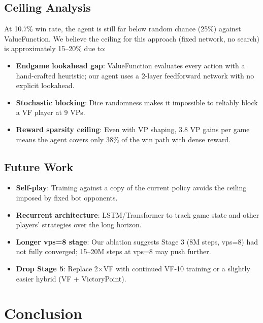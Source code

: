 \documentclass[10pt,twocolumn]{article}
\begin{document}
\subsection{Ceiling Analysis}

At 10.7\% win rate, the agent is still far below random chance (25\%) against
ValueFunction. We believe the ceiling for this approach (fixed network,
no search) is approximately 15--20\% due to:

\begin{itemize}
  \item \textbf{Endgame lookahead gap}: ValueFunction evaluates every action with
        a hand-crafted heuristic; our agent uses a 2-layer feedforward network
        with no explicit lookahead.
  \item \textbf{Stochastic blocking}: Dice randomness makes it impossible to
        reliably block a VF player at 9 VPs.
  \item \textbf{Reward sparsity ceiling}: Even with VP shaping, 3.8 VP gains per
        game means the agent covers only 38\% of the win path with dense reward.
\end{itemize}

\subsection{Future Work}

\begin{itemize}
  \item \textbf{Self-play}: Training against a copy of the current policy avoids
        the ceiling imposed by fixed bot opponents.
  \item \textbf{Recurrent architecture}: LSTM/Transformer to track game state
        and other players' strategies over the long horizon.
  \item \textbf{Longer vps=8 stage}: Our ablation suggests Stage 3 (8M steps,
        vps=8) had not fully converged; 15--20M steps at vps=8 may push further.
  \item \textbf{Drop Stage 5}: Replace 2$\times$VF with continued VF-10 training
        or a slightly easier hybrid (VF + VictoryPoint).
\end{itemize}

\section{Conclusion}
\end{document}
